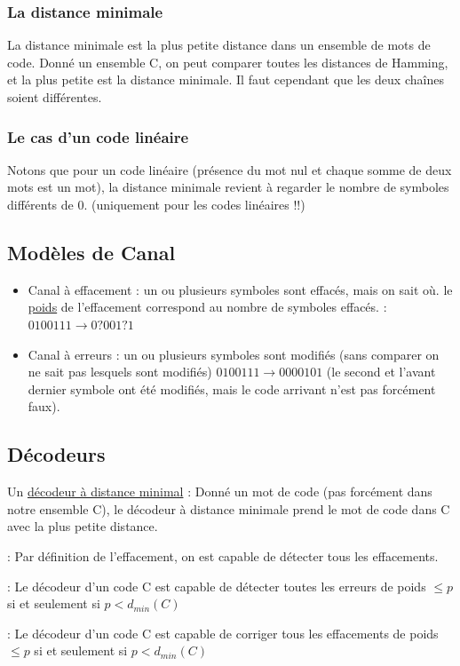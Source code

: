 \documentclass[11pt,a4paper]{article}
\begin{document}
\subsubsection{La distance minimale}
La distance minimale est la plus petite distance dans un ensemble de mots de code. Donné un ensemble C, on peut comparer toutes les distances de Hamming, et la plus petite est la distance minimale. Il faut cependant que les deux chaînes soient différentes. 
\subsubsection{Le cas d'un code linéaire}
Notons que pour un code linéaire (présence du mot nul et chaque somme de deux mots est un mot), la distance minimale revient à regarder le nombre de symboles différents de 0. (uniquement pour les codes linéaires !!)
\subsection{Modèles de Canal}
\begin{itemize}
	\item Canal à effacement : un ou plusieurs symboles sont effacés, mais on sait où. le \uline{poids} de l'effacement correspond au nombre de symboles effacés. : $0100111 \to 0?001?1$
	\item Canal à erreurs : un ou plusieurs symboles sont modifiés (sans comparer on ne sait pas lesquels sont modifiés) $0100111 \to 0000101$ (le second et l'avant dernier symbole ont été modifiés, mais le code arrivant n'est pas forcément faux).
\end{itemize}
\subsection{Décodeurs}
\label{canaux}
Un \uline{décodeur à distance minimal} : Donné un mot de code (pas forcément dans notre ensemble C), le décodeur à distance minimale prend le mot de code dans C avec la plus petite distance.

 : Par définition de l'effacement, on est capable de détecter tous les effacements.

 : Le décodeur d'un code C est capable de détecter toutes les erreurs de poids $\leq p$ si et seulement si $p < d_{min}(C)$ 

 : Le décodeur d'un code C est capable de corriger tous les effacements de poids $\leq p$ si et seulement si $p < d_{min}(C)$ 
\end{document}
